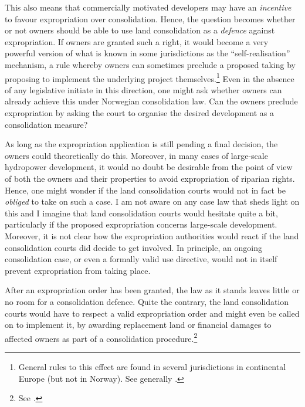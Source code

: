 This also means that commercially motivated developers may have an {\it incentive} to favour expropriation over consolidation. Hence, the question becomes whether or not owners should be able to use land consolidation as a {\it defence} against expropriation. If owners are granted such a right, it would become a very powerful version of what is known in some jurisdictions as the ``self-realisation'' mechanism, a rule whereby owners can sometimes preclude a proposed taking by proposing to implement the underlying project themselves.\footnote{General rules to this effect are found in several jurisdictions in continental Europe (but not in Norway). See generally \cite{sluysmans14}.}
Even in the absence of any legislative initiate in this direction, one might ask whether owners can already achieve this under Norwegian consolidation law. Can the owners preclude expropriation by asking the court to organise the desired development as a consolidation measure?

As long as the expropriation application is still pending a final decision, the owners could theoretically do this. Moreover, in many cases of large-scale hydropower development, it would no doubt be desirable from the point of view of both the owners and their properties to avoid expropriation of riparian rights. Hence, one might wonder if the land consolidation courts would not in fact be {\it obliged} to take on such a case. I am not aware on any case law that sheds light on this and I imagine that land consolidation courts would hesitate quite a bit, particularly if the proposed expropriation concerns large-scale development. Moreover, it is not clear how the expropriation authorities would react if the land consolidation courts did decide to get involved. In principle, an ongoing consolidation case, or even a formally valid use directive, would not in itself prevent expropriation from taking place.

After an expropriation order has been granted, the law as it stands leaves little or no room for a consolidation defence. Quite the contrary, the land consolidation courts would have to respect a valid expropriation order and might even be called on to implement it, by awarding replacement land or financial damages to affected owners as part of a consolidation procedure.\footnote{See \cite[6]{lca79}.}

